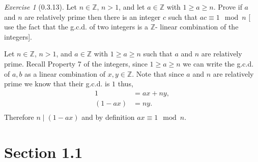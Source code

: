 \documentclass[12pt]{amsart}
\makeatletter
\theoremstyle{remark}
\newtheorem*{exercise}{Exercise}%
\def\ZZ{\ensuremath{\mathbb Z}}
\renewenvironment{proof}[1][\proofname]{\par\doublespacing
  \pushQED{\qed}%
  \normalfont \topsep6\p@\@plus6\p@\relax
  \list{}{%
    \settowidth{\leftmargin}{\itshape\proofname:\hskip\labelsep}%
    \setlength{\labelwidth}{0pt}%
    \setlength{\itemindent}{-\leftmargin}%
  }%
  \item[\hskip\labelsep\itshape#1\@addpunct{:}]\ignorespaces
}{%
  \popQED\endlist\@endpefalse
  \singlespacing
}
\theoremstyle{mycomment}
\makeatother
\begin{document}
\begin{exercise}[0.3.13] Let $n \in \ZZ$, $n > 1$, and let $a \in \ZZ$ with $1 \geq a \geq n$. Prove if $a$ and $n$ are relatively prime then there is an integer $c$ 
  such that $ac \equiv 1 \mod n$ [ use the fact that the g.c.d. of two integers is a $\ZZ$- linear combination of the integers].
  \begin{proof} Let $n \in \ZZ$, $n > 1$, and $a \in \ZZ$ with $1 \geq a \geq n$ such that $a$ and $n$ are relatively prime. Recall Property 7 of the integers, since
    $1 \geq a \geq n$ we can write the g.c.d. of $a, b$ as a linear combination of $x, y \in \ZZ$. Note that since $a$ and $n$ are relatively prime we know that their g.c.d. is $1$ thus, 
    \begin{align*}
      1 &= ax + ny,\\
      (1 - ax) &= ny.\\ 
    \end{align*}
    Therefore $n \mid (1 - ax)$ and by definition $ax \equiv 1 \mod n$.  
  \end{proof}
\end{exercise}


\section*{\textbf{Section 1.1}}
\end{document}
